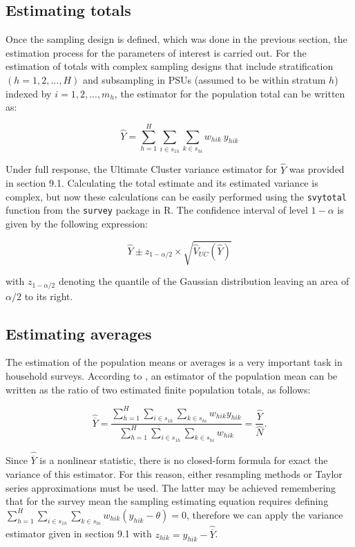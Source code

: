 \documentclass[
  12pt,
]{book}
\begin{document}
\hypertarget{estimating-totals}{%
\subsection{Estimating totals}\label{estimating-totals}}

Once the sampling design is defined, which was done in the previous section, the estimation process for the parameters of interest is carried out. For the estimation of totals with complex sampling designs that include stratification \(\left(h=1,2,...,H\right)\) and subsampling in PSUs (assumed to be within stratum \(h\)) indexed by \(i=1,2,...,m_h\), the estimator for the population total can be written as:

\[
\widehat{Y} = \sum_{h=1}^{H}\sum_{i \in s_{1h}} \sum_{ k \in s_{hi}} w_{hik} \ y_{hik}
\]

Under full response, the Ultimate Cluster variance estimator for \(\widehat{Y}\) was provided in section 9.1. Calculating the total estimate and its estimated variance is complex, but now these calculations can be easily performed using the \texttt{svytotal} function from the \texttt{survey} package in R. The confidence interval of level \(1 - \alpha\) is given by the following expression:

\[
\widehat{Y} \pm z_{1 - \alpha/2} \times \sqrt{\widehat{V}_{UC} \left( \widehat{Y}\right)}
\]

with \(z_{1 - \alpha/2}\) denoting the quantile of the Gaussian distribution leaving an area of \({\alpha/2}\) to its right.

\hypertarget{estimating-averages}{%
\subsection{Estimating averages}\label{estimating-averages}}

The estimation of the population means or averages is a very important task in household surveys. According to \citet{Gutierrez_2016}, an estimator of the population mean can be written as the ratio of two estimated finite population totals, as follows:

\[
\widehat{\overline{Y}} = \frac{\sum_{h=1}^{H}\sum_{i \in s_{1h}} \sum_{ k \in s_{hi}} w_{hik}y_{hik}} {\sum_{h=1}^{H}\sum_{i \in s_{1h}} \sum_{ k \in s_{hi}} w_{hik}} = \frac{\widehat{Y}}{\widehat{N}}.
\]

Since \(\widehat{\overline{Y}}\) is a nonlinear statistic, there is no closed-form formula for exact the variance of this estimator. For this reason, either resampling methods or Taylor series approximations must be used. The latter may be achieved remembering that for the survey mean the sampling estimating equation requires defining \(\sum_{h=1}^{H}\sum_{i \in s_{1h}} \sum_{ k \in s_{hi}} w_{hik} (y_{hik} - \theta) = 0\), therefore we can apply the variance estimator given in section 9.1 with \(z_{hik} = y_{hik} - \widehat{\overline{Y}}\).
\end{document}
